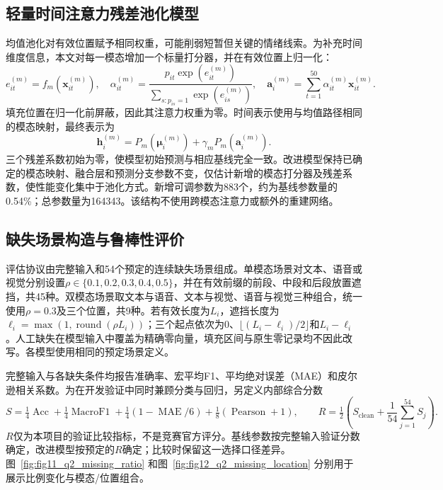 \subsection{轻量时间注意力残差池化模型}\label{subsec:q2_pool}
均值池化对有效位置赋予相同权重，可能削弱短暂但关键的情绪线索。为补充时间维度信息，本文对每一模态增加一个标量打分器，并在有效位置上归一化：
\begin{equation}
e_{it}^{(m)}=f_m(\mathbf x_{it}^{(m)}),\quad
\alpha_{it}^{(m)}
=\frac{p_{it}\exp(e_{it}^{(m)})}{\sum_{s:p_{is}=1}\exp(e_{is}^{(m)})},\quad
\mathbf a_i^{(m)}=\sum_{t=1}^{50}\alpha_{it}^{(m)}\mathbf x_{it}^{(m)} .
\label{eq:q2_attention}
\end{equation}
填充位置在归一化前屏蔽，因此其注意力权重为零。时间表示使用与均值路径相同的模态映射，最终表示为
\begin{equation}
\mathbf h_i^{(m)}
=P_m(\boldsymbol\mu_i^{(m)})
+\gamma_mP_m(\mathbf a_i^{(m)}).
\label{eq:q2_residual}
\end{equation}
三个残差系数初始为零，使模型初始预测与相应基线完全一致。改进模型保持已确定的模态映射、融合层和预测分支参数不变，仅估计新增的模态打分器及残差系数，使性能变化集中于池化方式。新增可调参数为883个，约为基线参数量的0.54\%；总参数量为164343。该结构不使用跨模态注意力或额外的重建网络。

\subsection{缺失场景构造与鲁棒性评价}\label{subsec:q2_benchmark}
评估协议由完整输入和54个预定的连续缺失场景组成。单模态场景对文本、语音或视觉分别设置$\rho\in\{0.1,0.2,0.3,0.4,0.5\}$，并在有效前缀的前段、中段和后段放置遮挡，共45种。双模态场景取文本与语音、文本与视觉、语音与视觉三种组合，统一使用$\rho=0.3$及三个位置，共9种。若有效长度为$L_i$，遮挡长度为$\ell_i=\max(1,\operatorname{round}(\rho L_i))$；三个起点依次为$0$、$\lfloor(L_i-\ell_i)/2\rfloor$和$L_i-\ell_i$。人工缺失在模型输入中覆盖为精确零向量，填充区间与原生零记录均不因此改写。各模型使用相同的预定场景定义。

完整输入与各缺失条件均报告准确率、宏平均F1、平均绝对误差（MAE）和皮尔逊相关系数。为在开发验证中同时兼顾分类与回归，另定义内部综合分数
\begin{equation}
S=\tfrac14\operatorname{Acc}+\tfrac14\operatorname{MacroF1}
+\tfrac14(1-\operatorname{MAE}/6)
+\tfrac18(\operatorname{Pearson}+1),\qquad
R=\tfrac12\!\left(S_{\mathrm{clean}}+\frac1{54}\sum_{j=1}^{54}S_j\right).
\label{eq:q2_score}
\end{equation}
$R$仅为本项目的验证比较指标，不是竞赛官方评分。基线参数按完整输入验证分数确定，改进模型按预定的$R$确定；比较时保留这一选择口径差异。图~\ref{fig:fig11_q2_missing_ratio} 和图~\ref{fig:fig12_q2_missing_location} 分别用于展示比例变化与模态/位置组合。

